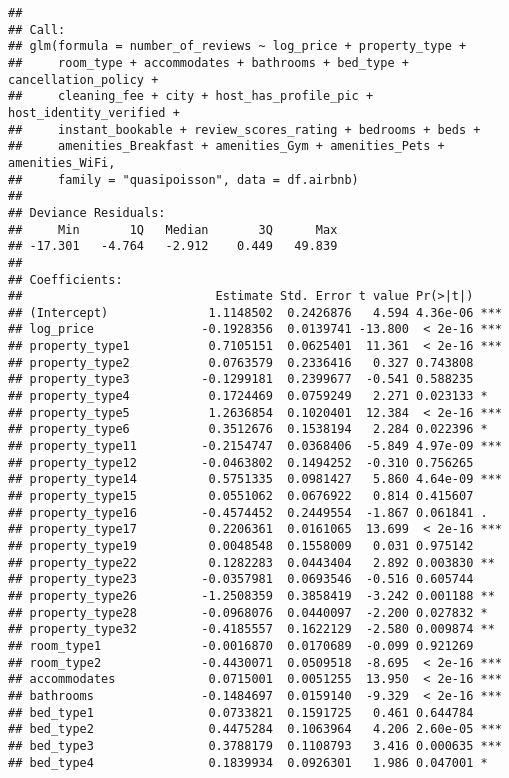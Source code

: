 \documentclass[
]{article}
\begin{document}
\begin{verbatim}
## 
## Call:
## glm(formula = number_of_reviews ~ log_price + property_type + 
##     room_type + accommodates + bathrooms + bed_type + cancellation_policy + 
##     cleaning_fee + city + host_has_profile_pic + host_identity_verified + 
##     instant_bookable + review_scores_rating + bedrooms + beds + 
##     amenities_Breakfast + amenities_Gym + amenities_Pets + amenities_WiFi, 
##     family = "quasipoisson", data = df.airbnb)
## 
## Deviance Residuals: 
##     Min       1Q   Median       3Q      Max  
## -17.301   -4.764   -2.912    0.449   49.839  
## 
## Coefficients:
##                           Estimate Std. Error t value Pr(>|t|)    
## (Intercept)              1.1148502  0.2426876   4.594 4.36e-06 ***
## log_price               -0.1928356  0.0139741 -13.800  < 2e-16 ***
## property_type1           0.7105151  0.0625401  11.361  < 2e-16 ***
## property_type2           0.0763579  0.2336416   0.327 0.743808    
## property_type3          -0.1299181  0.2399677  -0.541 0.588235    
## property_type4           0.1724469  0.0759249   2.271 0.023133 *  
## property_type5           1.2636854  0.1020401  12.384  < 2e-16 ***
## property_type6           0.3512676  0.1538194   2.284 0.022396 *  
## property_type11         -0.2154747  0.0368406  -5.849 4.97e-09 ***
## property_type12         -0.0463802  0.1494252  -0.310 0.756265    
## property_type14          0.5751335  0.0981427   5.860 4.64e-09 ***
## property_type15          0.0551062  0.0676922   0.814 0.415607    
## property_type16         -0.4574452  0.2449554  -1.867 0.061841 .  
## property_type17          0.2206361  0.0161065  13.699  < 2e-16 ***
## property_type19          0.0048548  0.1558009   0.031 0.975142    
## property_type22          0.1282283  0.0443404   2.892 0.003830 ** 
## property_type23         -0.0357981  0.0693546  -0.516 0.605744    
## property_type26         -1.2508359  0.3858419  -3.242 0.001188 ** 
## property_type28         -0.0968076  0.0440097  -2.200 0.027832 *  
## property_type32         -0.4185557  0.1622129  -2.580 0.009874 ** 
## room_type1              -0.0016870  0.0170689  -0.099 0.921269    
## room_type2              -0.4430071  0.0509518  -8.695  < 2e-16 ***
## accommodates             0.0715001  0.0051255  13.950  < 2e-16 ***
## bathrooms               -0.1484697  0.0159140  -9.329  < 2e-16 ***
## bed_type1                0.0733821  0.1591725   0.461 0.644784    
## bed_type2                0.4475284  0.1063964   4.206 2.60e-05 ***
## bed_type3                0.3788179  0.1108793   3.416 0.000635 ***
## bed_type4                0.1839934  0.0926301   1.986 0.047001 *  

\end{verbatim}
\end{document}

